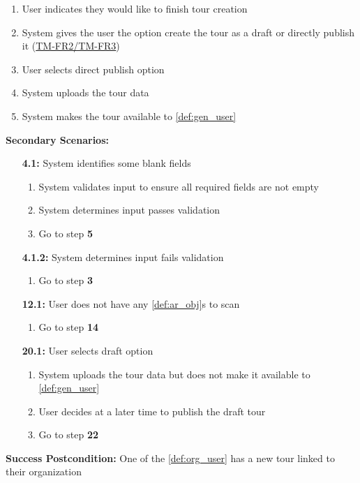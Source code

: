 \documentclass{article}
\begin{document}
\begin{enumerate}[label=\textbf{UC\arabic*}]
\begin{enumerate}[label=\textbf{\arabic*.}]
            \item User indicates they would like to finish tour creation
            \item System gives the user the option create the tour as a draft or directly publish it (\hyperref[ssub:tour_management]{TM-FR2/TM-FR3})
            \item User selects direct publish option
            \item System uploads the tour data
            \item System makes the tour available to \ref{def:gen_user}
        \end{enumerate}
    
        \textbf{Secondary Scenarios:} 
        \begin{itemize}
            \item[{\bf 4.1:}] System identifies some blank fields
            \begin{enumerate}[label=\textbf{\arabic*.}]
                \item System validates input to ensure all required fields are not empty
                \item System determines input passes validation
                \item Go to step \textbf{5}
            \end{enumerate}
            \item[{\bf 4.1.2:}] System determines input fails validation
            \begin{enumerate}[label=\textbf{\arabic*.}]
                \item Go to step \textbf{3}
            \end{enumerate}
            \item[{\bf 12.1:}] User does not have any \ref{def:ar_obj}s to scan
            \begin{enumerate}[label=\textbf{\arabic*.}]
                \item Go to step \textbf{14}
            \end{enumerate}
            \item[{\bf 20.1:}] User selects draft option
            \begin{enumerate}[label=\textbf{\arabic*.}]
                \item System uploads the tour data but does not make it available to \ref{def:gen_user}
                \item User decides at a later time to publish the draft tour
                \item Go to step \textbf{22}
            \end{enumerate}
        \end{itemize}
        \textbf{Success Postcondition:} One of the \ref{def:org_user} has a new tour linked to their organization


\end{enumerate}
\end{document}
